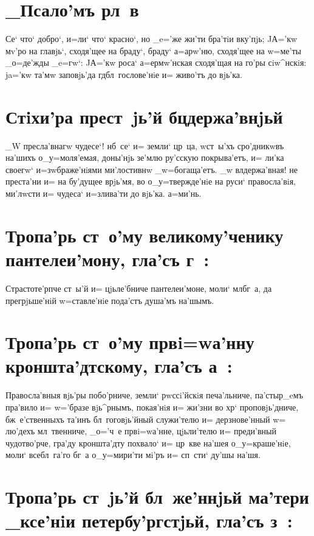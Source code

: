 \documentclass[12pt,twoside,xdvi,a6paper,civil=times]{hipbook}
\renewcommand{\*}{\raise3pt\hbox{\footnotesize*}}
\begin{document}
\section{_Псало'мъ рл~в}

Се` что` добро`, и=ли` что` красно`, но _e='же жи'ти бра'тiи вку'пjь; JА='кw
мv'ро на гла\-вjь`, схо\-дя'\-щее на браду`, браду` а=арw'ню, схо\-дя'\-щее на w=ме'ты
_о=де'жды _e=гw`: JА='кw роса` а=ермw'нская сходя'щая на го'ры сiw^нскiя:
ja='кw та'мw заповjь'да гд бл~гослове'нiе и= живо'тъ до вjь'ка.

\section{Стiхи'ра прест~jь'й бц держа'внjьй}

_W пресла'внагw чудесе`! нб~се` и= земли` цр~ца, w\т ст~ы'хъ сро'дникwвъ
на'шихъ о_у=моля'емая, доны'нjь зе'млю ру'сскую покрыва'етъ, и= ли'ка своегw`
и=зwбраже'нiями ми'лостивнw _w=бо\-га\-ща'\-етъ. _w вл держа'вная! не преста'ни
и= на бу'дущее врjь'мя, во о_у=твержде'нiе на руси` правосла'вiя, ми'лwсти и=
чудеса` и=злива'ти до вjь'ка. а=ми'нь.

\section[Тропа'рь ст~. влкмч. пантелеи'мону]
{Тропа'рь ст~о'му великому'ченику\\пантелеи'мону, гла'съ г~:}

Страстоте'рпче ст~ы'й и= цjьле'бниче пантелеи'моне, моли` мл бг~а, да
прегрjьше'нiй w=ставле'нiе пода'стъ душа'мъ на'шымъ.

\section[Тропа'рь ст~. прв\д. i=wа'нну кроншта'дтскому]
{Тропа'рь ст~о'му прв i=wа'нну кроншта'дтскому, гла'съ а~:}

Правосла'вныя вjь'ры побо'рниче, земли` рwс\-сi'й\-скiя печа'льниче, па'стыр_eмъ
пра'вило и= w='бразе вjь^рнымъ, покая'нiя и= жи'зни во хр`
проповjь'дниче, бж~е'ственныхъ та'инъ бл~гоговjь'йный служи'телю и=
дерзнове'нный w= лю'дехъ мл~твенниче, _о='ч~е прв i=wа'нне, цjьли'телю
и= преди'вный чудотво'рче, гра'ду кроншта'дту похвало` и= цр~кве на'шея
о_у=\-кра\-ше'\-нiе, моли` всебл~га'го бг~а о_у=мири'ти мi'ръ и= сп~сти` ду'шы
на'шя.

\section[Тропа'рь ст~. бл~ж. _ксе'нiи петербу'ргстjьй]
{Тропа'рь ст~jь'й бл~же'ннjьй ма'тери _ксе'нiи петербу'ргстjьй, гла'съ з~:}
\end{document}
